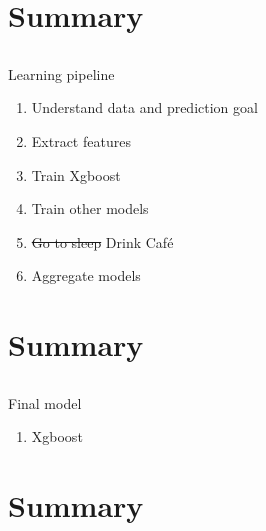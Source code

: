 \section{Summary} \subsection{}\label{}

\begin{frame}{Learning pipeline}
	
	\begin{enumerate}
		\item Understand data and prediction goal
		\item Extract features
		\item Train Xgboost
		\item Train other models
		\item \sout{Go to sleep} Drink Café 
		\item Aggregate models
	\end{enumerate}
		
\end{frame}

\section{Summary} \subsection{}\label{}

\begin{frame}{Final model}
	
		
		\begin{enumerate}
			\item Xgboost
		\end{enumerate}
		
\end{frame}

\section{Summary} \subsection{}\label{}

